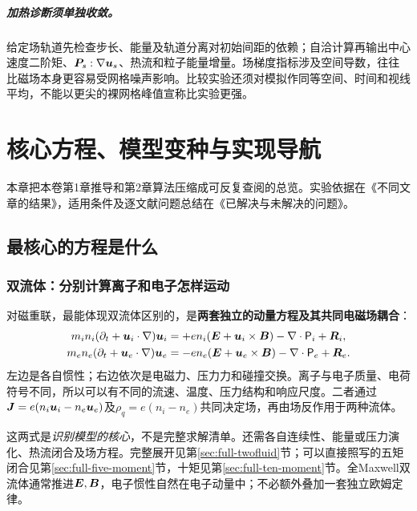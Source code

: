 \documentclass[UTF8,a4paper,11pt,openany,fontset=fandol]{ctexbook}
\begin{document}
\paragraph{加热诊断须单独收敛。}
给定场轨道先检查步长、能量及轨道分离对初始间距的依赖；自洽计算再输出中心速度二阶矩、$\bm{P}_s:\nabla\bm{u}_s$、热流和粒子能量增量。场梯度指标涉及空间导数，往往比磁场本身更容易受网格噪声影响。比较实验还须对模拟作同等空间、时间和视线平均，不能以更尖的裸网格峰值宣称比实验更强。

\chapter{核心方程、模型变种与实现导航}\label{ch:core-guide}
本章把本卷第1章推导和第2章算法压缩成可反复查阅的总览。实验依据在《不同文章的结果》，适用条件及逐文献问题总结在《已解决与未解决的问题》。
\section{最核心的方程是什么}
\subsection{双流体：分别计算离子和电子怎样运动}
对磁重联，最能体现双流体区别的，是\textbf{两套独立的动量方程及其共同电磁场耦合}：
\begin{align}
 m_in_i(\partial_t+\bm{u}_i\cdot\nabla)\bm{u}_i
 &=+en_i(\bm{E}+\bm{u}_i\times\bm{B})-\nabla\cdot\mathsf P_i+\bm{R}_i,\\
 m_en_e(\partial_t+\bm{u}_e\cdot\nabla)\bm{u}_e
 &=-en_e(\bm{E}+\bm{u}_e\times\bm{B})-\nabla\cdot\mathsf P_e+\bm{R}_e.
\end{align}
左边是各自惯性；右边依次是电磁力、压力力和碰撞交换。离子与电子质量、电荷符号不同，所以可以有不同的流速、温度、压力结构和响应尺度。二者通过
$\bm{J}=e(n_i\bm{u}_i-n_e\bm{u}_e)$及$\rho_q=e(n_i-n_e)$共同决定场，再由场反作用于两种流体。

这两式是\emph{识别模型的核心}，不是完整求解清单。还需各自连续性、能量或压力演化、热流闭合及场方程。完整展开见第\ref{sec:full-twofluid}节；可以直接照写的五矩闭合见第\ref{sec:full-five-moment}节，十矩见第\ref{sec:full-ten-moment}节。全Maxwell双流体通常推进$\bm{E},\bm{B}$，电子惯性自然在电子动量中；不必额外叠加一套独立欧姆定律。\citep{Wang2015}
\end{document}
